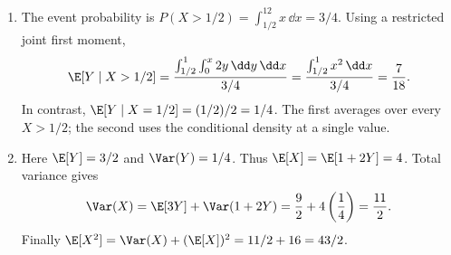 \begin{enumerate}[label=\textbf{G\arabic*.},leftmargin=*,itemsep=1em]
\[
P(Y>1/8\mid X=1/2)=\int_{1/8}^{1/4}4\,\dd y=\frac12.
\]
\item The event probability is $P(X>1/2)=\int_{1/2}^12x\,\dd x=3/4$. Using a restricted joint first moment,
\[
\E[Y\mid X>1/2]
=\frac{\int_{1/2}^1\int_0^x2y\,\dd y\,\dd x}{3/4}
=\frac{\int_{1/2}^1x^2\,\dd x}{3/4}
=\frac7{18}.
\]
In contrast, $\E[Y\mid X=1/2]=(1/2)/2=1/4$. The first averages over every $X>1/2$; the second uses the conditional density at a single value.
\item Here $\E[Y]=3/2$ and $\Var(Y)=1/4$. Thus $\E[X]=\E[1+2Y]=4$. Total variance gives
\[
\Var(X)=\E[3Y]+\Var(1+2Y)=\frac92+4\left(\frac14\right)=\frac{11}{2}.
\]
Finally $\E[X^2]=\Var(X)+(\E[X])^2=11/2+16=43/2$.
\end{enumerate}
